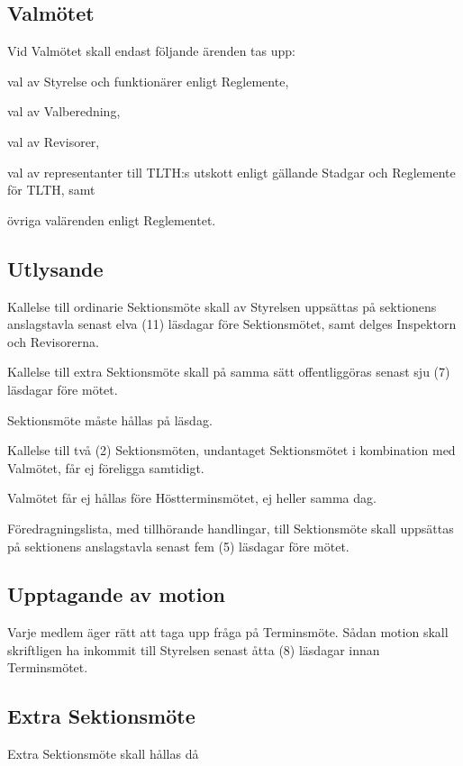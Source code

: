 \documentclass[10pt]{article}
\begin{document}
    \subsection{Valmötet}
    Vid Valmötet skall endast följande ärenden tas upp:
    \begin{alphlist}
    \item val av Styrelse och funktionärer enligt Reglemente,
    \item val av Valberedning,
    \item val av Revisorer,
    \item val av representanter till TLTH:s utskott enligt gällande Stadgar och
        Reglemente för TLTH, samt
    \item övriga valärenden enligt Reglementet.
    \end{alphlist}
    
    \subsection{Utlysande}
    Kallelse till ordinarie Sektionsmöte skall av Styrelsen uppsättas på
    sektionens anslagstavla senast elva (11) läsdagar före Sektionsmötet, samt
    delges Inspektorn och Revisorerna.
    
    Kallelse till extra Sektionsmöte skall på samma sätt offentliggöras senast
    sju (7) läsdagar före mötet.
    
    Sektionsmöte måste hållas på läsdag.
    
    Kallelse till två (2) Sektionsmöten, undantaget Sektionsmötet i kombination
    med Valmötet, får ej föreligga samtidigt.
    
    Valmötet får ej hållas före Höstterminsmötet, ej heller samma dag.
    
    Föredragningslista, med tillhörande handlingar, till Sektionsmöte skall
    uppsättas på sektionens anslagstavla senast fem (5) läsdagar före mötet.
    
    \subsection{Upptagande av motion}
    Varje medlem äger rätt att taga upp fråga på Terminsmöte.
    Sådan motion skall skriftligen ha inkommit till Styrelsen senast åtta (8)
    läsdagar innan Terminsmötet.
    
    \subsection{Extra Sektionsmöte}
    Extra Sektionsmöte skall hållas då
    
\end{document}
